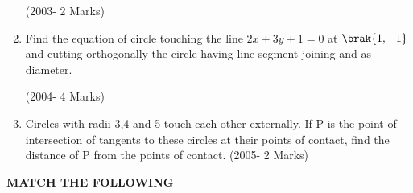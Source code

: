 \documentclass[journal,12pt,twocolumn]{IEEEtran}
\theoremstyle{remark}
\begin{document}
\begin{enumerate}
\hfill(2003- 2 Marks)\\ 





\item Find the equation of circle touching the line $2x+3y+1=0$ at $\brak{1,-1}$ and cutting orthogonally the circle having line segment joining  and  as diameter.


\hfill(2004- 4 Marks)\\     




\item Circles with radii 3,4 and 5 touch each other externally. If P is the point of intersection of tangents to these circles at their points of contact, find the distance of P from the points of contact.
	           \hfill(2005- 2 Marks)\\ 
\end{enumerate}
\newpage

\textbf{MATCH THE FOLLOWING}\\
\end{document}
